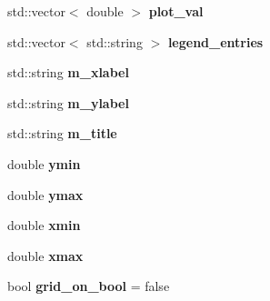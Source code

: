 \begin{DoxyCompactItemize}
\item 
\hypertarget{classkeycpp_1_1_plots_a95cfb5daf2425e227f5148c7c6a04e80}{std\-::vector$<$ double $>$ {\bfseries plot\-\_\-val}}\label{classkeycpp_1_1_plots_a95cfb5daf2425e227f5148c7c6a04e80}

\item 
\hypertarget{classkeycpp_1_1_plots_a25df6878ccfbbe680c5324e0fab789ac}{std\-::vector$<$ std\-::string $>$ {\bfseries legend\-\_\-entries}}\label{classkeycpp_1_1_plots_a25df6878ccfbbe680c5324e0fab789ac}

\item 
\hypertarget{classkeycpp_1_1_plots_a18a69c533594b4bc1c88fdb29267db1e}{std\-::string {\bfseries m\-\_\-xlabel}}\label{classkeycpp_1_1_plots_a18a69c533594b4bc1c88fdb29267db1e}

\item 
\hypertarget{classkeycpp_1_1_plots_ad2987af367059a0659e013708342451b}{std\-::string {\bfseries m\-\_\-ylabel}}\label{classkeycpp_1_1_plots_ad2987af367059a0659e013708342451b}

\item 
\hypertarget{classkeycpp_1_1_plots_a849d297c44ebca4f7c856c99cfcc2b5f}{std\-::string {\bfseries m\-\_\-title}}\label{classkeycpp_1_1_plots_a849d297c44ebca4f7c856c99cfcc2b5f}

\item 
\hypertarget{classkeycpp_1_1_plots_a54578198c41d34705e9fbe94a88ec6ae}{double {\bfseries ymin}}\label{classkeycpp_1_1_plots_a54578198c41d34705e9fbe94a88ec6ae}

\item 
\hypertarget{classkeycpp_1_1_plots_ad411158572c6ee36b1f4abc9c9dfec77}{double {\bfseries ymax}}\label{classkeycpp_1_1_plots_ad411158572c6ee36b1f4abc9c9dfec77}

\item 
\hypertarget{classkeycpp_1_1_plots_a1d027ed119d5b4a8d7d9ccc72f9a0eb1}{double {\bfseries xmin}}\label{classkeycpp_1_1_plots_a1d027ed119d5b4a8d7d9ccc72f9a0eb1}

\item 
\hypertarget{classkeycpp_1_1_plots_a4d7f34173d13de92014702ffba6fb1d4}{double {\bfseries xmax}}\label{classkeycpp_1_1_plots_a4d7f34173d13de92014702ffba6fb1d4}

\item 
\hypertarget{classkeycpp_1_1_plots_abd0c4449bcd999429a3073e2885708d8}{bool {\bfseries grid\-\_\-on\-\_\-bool} = false}\label{classkeycpp_1_1_plots_abd0c4449bcd999429a3073e2885708d8}


\end{DoxyCompactItemize}
